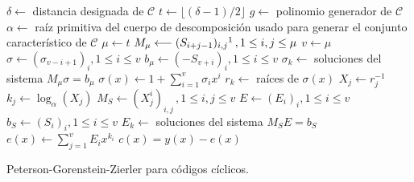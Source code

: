 \begin{Ualgorithm}[htbp]
  \DontPrintSemicolon
  \(\delta \longleftarrow\) distancia designada de \(\mathcal C\)\;
  \(t \longleftarrow \lfloor(\delta - 1)/2\rfloor\)\;
  \(g \longleftarrow\) polinomio generador de \(\mathcal C\)\;
  \(\alpha \longleftarrow\) raíz primitiva del cuerpo de descomposición usado para generar el conjunto característico de \(\mathcal C\)\;
  \(\mu \longleftarrow t\)\;
  \(M_{\mu} \longleftarrow (S_{i + j - 1})_{i, j}\footnotemark\,, 1 \leq i, j \leq \mu \)\;
  \(v \longleftarrow \mu\)\;
  \(\sigma \longleftarrow (\sigma_{v - i + 1})_i, 1 \leq i \leq v\)\;
  \(b_{\mu} \longleftarrow (-S_{v + i})_i, 1 \leq i \leq v\)\;
  \(\sigma_k \longleftarrow\) soluciones del sistema \(M_{\mu}\sigma = b_{\mu}\)\;
  \(\sigma(x) \longleftarrow 1 + \sum_{i=1}^{v} \sigma_i x^i\)\;
  \(r_k \longleftarrow\) raíces de \(\sigma(x)\)\;
  \(X_j \longleftarrow r_j^{-1}\) \;
  \(k_j \longleftarrow \log_{\alpha}(X_j)\) \;
  \(M_{S} \longleftarrow (X_{j}^{i})_{i, j}\,, 1 \leq i, j \leq v \)\;
  \(E \longleftarrow (E_i)_i, 1 \leq i \leq v\)\;
  \(b_{S} \longleftarrow (S_{i})_i, 1 \leq i \leq v\)\;
  \(E_k \longleftarrow\) soluciones del sistema \(M_{S}E = b_{S}\)\;
  \(e(x) \longleftarrow \sum_{j=1}^v E_ix^{k_i}\)\;
  \(c(x) = y(x) - e(x)\)\;
  \caption{Peterson-Gorenstein-Zierler para códigos cíclicos.}
  \label{alg:pgz-cc}
\end{Ualgorithm}
